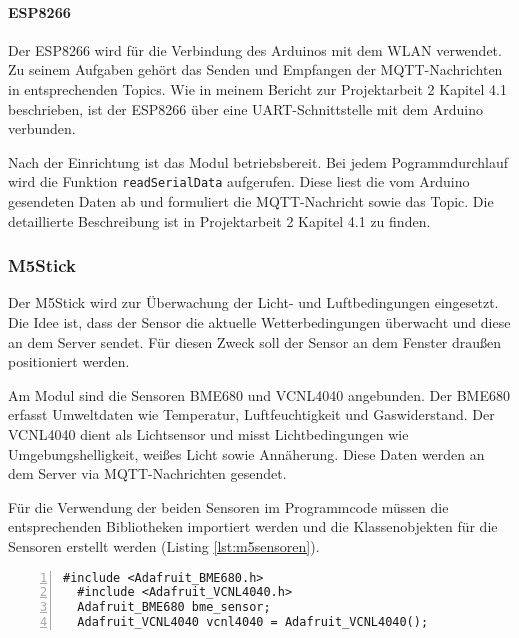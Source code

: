 \documentclass[12pt, letterpaper]{article}
\begin{document}
  \paragraph{ESP8266}
  \par Der ESP8266 wird für die Verbindung des Arduinos mit dem WLAN verwendet. Zu seinem Aufgaben gehört das Senden und Empfangen der MQTT-Nachrichten in entsprechenden Topics. Wie in meinem Bericht zur Projektarbeit 2 \cite{pa2} Kapitel 4.1 beschrieben, ist der ESP8266 über eine UART-Schnittstelle mit dem Arduino verbunden.
  \par Nach der Einrichtung ist das Modul betriebsbereit. Bei jedem Pogrammdurchlauf wird die Funktion \texttt{readSerialData} aufgerufen. Diese liest die vom Arduino gesendeten Daten ab und formuliert die MQTT-Nachricht sowie das Topic. Die detaillierte Beschreibung ist in Projektarbeit 2 \cite{pa2} Kapitel 4.1 zu finden. 
  
  \subsubsection{M5Stick}
  \par Der M5Stick wird zur Überwachung der Licht- und Luftbedingungen eingesetzt. Die Idee ist, dass der Sensor die aktuelle Wetterbedingungen überwacht und diese an dem Server sendet. Für diesen Zweck soll der Sensor an dem Fenster draußen positioniert werden.
  \par Am Modul sind die Sensoren BME680 und VCNL4040 angebunden. Der BME680 erfasst Umweltdaten wie Temperatur, Luftfeuchtigkeit und Gaswiderstand. Der VCNL4040 dient als Lichtsensor und misst Lichtbedingungen wie Umgebungshelligkeit, weißes Licht sowie Annäherung. Diese Daten werden an dem Server via MQTT-Nachrichten gesendet.
  \par Für die Verwendung der beiden Sensoren im Programmcode müssen die entsprechenden Bibliotheken importiert werden und die Klassenobjekten für die Sensoren erstellt werden (Listing \ref{lst:m5sensoren}). 
\begin{lstlisting}[frame=single, style=cpp, numbers=left, label={lst:m5sensoren}, caption={M5Stick: Sensoren}]
  #include <Adafruit_BME680.h>
  #include <Adafruit_VCNL4040.h>
  Adafruit_BME680 bme_sensor;
  Adafruit_VCNL4040 vcnl4040 = Adafruit_VCNL4040();
\end{lstlisting}
\end{document}

